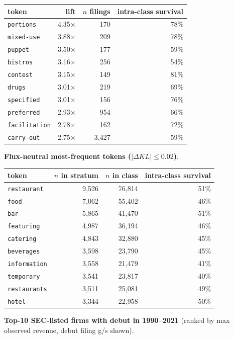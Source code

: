 \begin{tabular}{lrrr}
\toprule
token & lift & $n$ filings & intra-class survival \\
\midrule
\texttt{portions} & 4.35$\times$ & 170 & 78\% \\
\texttt{mixed-use} & 3.88$\times$ & 209 & 78\% \\
\texttt{puppet} & 3.50$\times$ & 177 & 59\% \\
\texttt{bistros} & 3.16$\times$ & 256 & 54\% \\
\texttt{contest} & 3.15$\times$ & 149 & 81\% \\
\texttt{drugs} & 3.01$\times$ & 219 & 69\% \\
\texttt{specified} & 3.01$\times$ & 156 & 76\% \\
\texttt{preferred} & 2.93$\times$ & 954 & 66\% \\
\texttt{facilitation} & 2.78$\times$ & 162 & 72\% \\
\texttt{carry-out} & 2.75$\times$ & 3,427 & 59\% \\
\bottomrule
\end{tabular}

\textbf{Flux-neutral most-frequent tokens ($|\Delta KL|\leq 0.02$)}.

\begin{tabular}{lrrr}
\toprule
token & $n$ in stratum & $n$ in class & intra-class survival \\
\midrule
\texttt{restaurant} & 9,526 & 76,814 & 51\% \\
\texttt{food} & 7,062 & 55,402 & 46\% \\
\texttt{bar} & 5,865 & 41,470 & 51\% \\
\texttt{featuring} & 4,987 & 36,194 & 46\% \\
\texttt{catering} & 4,843 & 32,880 & 45\% \\
\texttt{beverages} & 3,598 & 23,790 & 45\% \\
\texttt{information} & 3,558 & 21,479 & 41\% \\
\texttt{temporary} & 3,541 & 23,817 & 40\% \\
\texttt{restaurants} & 3,511 & 25,081 & 49\% \\
\texttt{hotel} & 3,344 & 22,958 & 50\% \\
\bottomrule
\end{tabular}

\textbf{Top-10 SEC-listed firms with debut in 1990--2021} (ranked by max observed revenue, debut filing g/s shown).

